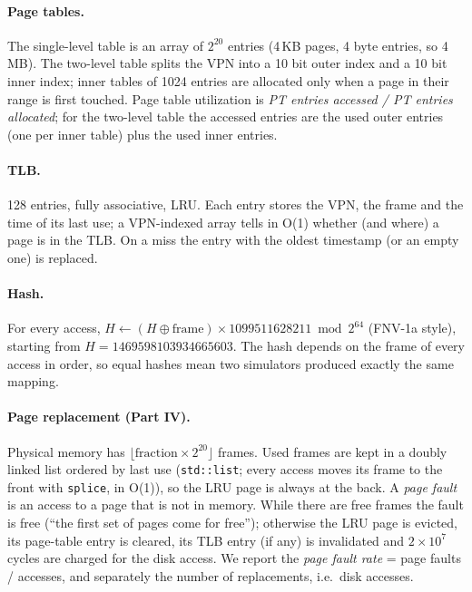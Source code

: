 \documentclass[11pt,a4paper]{article}
\begin{document}
\paragraph{Page tables.} The single-level table is an array of $2^{20}$ entries (4\,KB pages,
4 byte entries, so 4\,MB). The two-level table splits the VPN into a 10 bit outer index and a 10
bit inner index; inner tables of 1024 entries are allocated only when a page in their range is
first touched. Page table utilization is \emph{PT entries accessed / PT entries allocated}; for
the two-level table the accessed entries are the used outer entries (one per inner table) plus
the used inner entries.

\paragraph{TLB.} 128 entries, fully associative, LRU. Each entry stores the VPN, the frame and the
time of its last use; a VPN-indexed array tells in O(1) whether (and where) a page is in the TLB.
On a miss the entry with the oldest timestamp (or an empty one) is replaced.

\paragraph{Hash.} For every access, $H \leftarrow (H \oplus \text{frame}) \times 1099511628211
\bmod 2^{64}$ (FNV-1a style), starting from $H = 1469598103934665603$. The hash depends on the frame
of every access in order, so equal hashes mean two simulators produced exactly the same mapping.

\paragraph{Page replacement (Part IV).} Physical memory has
$\lfloor \text{fraction}\times 2^{20}\rfloor$ frames. Used frames are kept in a doubly linked list
ordered by last use (\texttt{std::list}; every access moves its frame to the front with
\texttt{splice}, in O(1)), so the LRU page is always at the back. A \emph{page fault} is an access to
a page that is not in memory. While there are free frames the fault is free (``the first set of
pages come for free''); otherwise the LRU page is evicted, its page-table entry is cleared, its
TLB entry (if any) is invalidated and $2\times10^{7}$ cycles are charged for the disk access. We
report the \emph{page fault rate} = page faults / accesses, and separately the number of
replacements, i.e.\ disk accesses.
\end{document}
